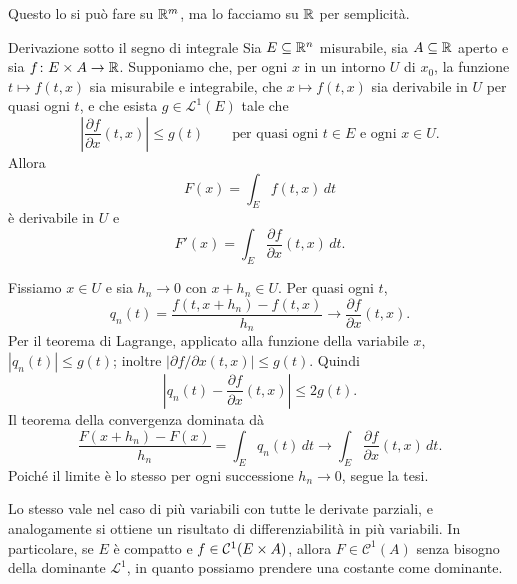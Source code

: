 \documentclass[a4paper]{article}
\begin{document}
\begin{radioactive}
Questo lo si può fare su \(\mathbb{R}^m\),
ma lo facciamo su \(\mathbb{R}\) per semplicità.
\end{radioactive}

\begin{radioactive}
\begin{snippettheorem}{Derivazione sotto il segno di integrale}
    Sia \(E\subseteq\mathbb{R}^n\) misurabile, sia \(A\subseteq\mathbb{R}\)
    aperto e sia
    \(f\colon E\times A\to\mathbb{R}\). Supponiamo che, per ogni
    \(x\) in un intorno \(U\) di \(x_0\), la funzione \(t\mapsto f(t,x)\) sia
    misurabile e integrabile, che \(x\mapsto f(t,x)\) sia derivabile in \(U\) per
    quasi ogni \(t\), e che esista \(g\in \mathcal L^1(E)\) tale che
    \[
        \left|\frac{\partial f}{\partial x}(t,x)\right|\leq g(t)
        \qquad\text{per quasi ogni }t\in E\text{ e ogni }x\in U.
    \]
    Allora
    \[
        F(x)=\int_E f(t,x)\,dt
    \]
    è derivabile in \(U\) e
    \[
        F'(x)=\int_E\frac{\partial f}{\partial x}(t,x)\,dt.
    \]
\end{snippettheorem}
\end{radioactive}

\begin{radioactive}
\begin{snippetproof}{}
    Fissiamo \(x\in U\) e sia \(h_n\to0\) con \(x+h_n\in U\). Per quasi ogni
    \(t\),
    \[
        q_n(t)=\frac{f(t,x+h_n)-f(t,x)}{h_n}
        \longrightarrow \frac{\partial f}{\partial x}(t,x).
    \]
    Per il teorema di Lagrange, applicato alla funzione della variabile \(x\),
    \(|q_n(t)|\leq g(t)\); inoltre
    \(\left|\partial f/\partial x(t,x)\right|\leq g(t)\). Quindi
    \[
        \left|q_n(t)-\frac{\partial f}{\partial x}(t,x)\right|\leq2g(t).
    \]
    Il teorema della convergenza dominata dà
    \[
        \frac{F(x+h_n)-F(x)}{h_n}
        =\int_Eq_n(t)\,dt
        \longrightarrow
        \int_E\frac{\partial f}{\partial x}(t,x)\,dt.
    \]
    Poiché il limite è lo stesso per ogni successione \(h_n\to0\), segue la tesi.
\end{snippetproof}
\end{radioactive}

\begin{radioactive}
Lo stesso vale nel caso di più variabili con tutte le derivate parziali, e analogamente si ottiene un risultato di differenziabilità in più variabili.
In particolare, se \(E\) è compatto e \(f \in \mathcal C^1(E \times A)\),
allora \(F \in \mathcal C^1(A)\) senza bisogno della dominante \(\mathcal L^1\),
in quanto possiamo prendere una costante come dominante.
\end{radioactive}
\end{document}
